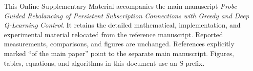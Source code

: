 \documentclass[manuscript,nonacm]{acmart}
\begin{document}
\maketitle
\raggedbottom
This Online Supplementary Material accompanies the main manuscript
\emph{Probe-Guided Rebalancing of Persistent Subscription Connections with
Greedy and Deep Q-Learning Control}. It retains the detailed mathematical,
implementation, and experimental material relocated from the reference
manuscript. Reported measurements, comparisons, and figures are unchanged.
References explicitly marked ``of the main paper'' point to the separate
main manuscript. Figures, tables, equations, and algorithms in this document
use an S prefix.
\appendix
\renewcommand{\thefigure}{S\arabic{figure}}
\renewcommand{\thetable}{S\arabic{table}}
\renewcommand{\theequation}{S\arabic{equation}}
\renewcommand{\thealgocf}{S\arabic{algocf}}
\setcounter{tocdepth}{1}
\tableofcontents
\clearpage













\FloatBarrier


\end{document}
